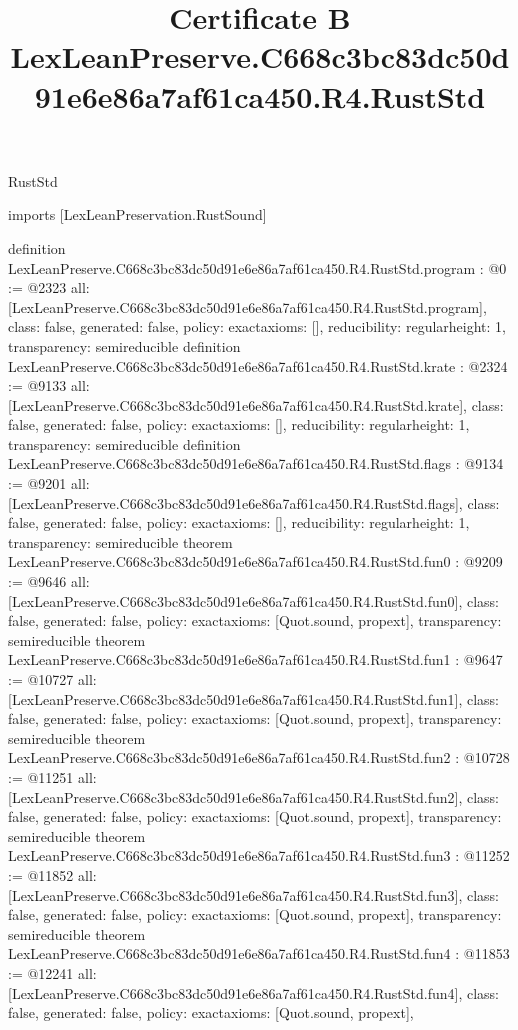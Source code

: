 \begin{lexlean}{RustStd}
\title{Certificate B LexLeanPreserve.C668c3bc83dc50d91e6e86a7af61ca450.R4.RustStd}
\begin{coremodule}
imports [LexLeanPreservation.RustSound]

definition LexLeanPreserve.C668c3bc83dc50d91e6e86a7af61ca450.R4.RustStd.program : @0 := @2323 {
  all: [LexLeanPreserve.C668c3bc83dc50d91e6e86a7af61ca450.R4.RustStd.program],
  class: false,
  generated: false,
  policy: exact{axioms: []},
  reducibility: regular{height: 1},
  transparency: semireducible
}
definition LexLeanPreserve.C668c3bc83dc50d91e6e86a7af61ca450.R4.RustStd.krate : @2324 := @9133 {
  all: [LexLeanPreserve.C668c3bc83dc50d91e6e86a7af61ca450.R4.RustStd.krate],
  class: false,
  generated: false,
  policy: exact{axioms: []},
  reducibility: regular{height: 1},
  transparency: semireducible
}
definition LexLeanPreserve.C668c3bc83dc50d91e6e86a7af61ca450.R4.RustStd.flags : @9134 := @9201 {
  all: [LexLeanPreserve.C668c3bc83dc50d91e6e86a7af61ca450.R4.RustStd.flags],
  class: false,
  generated: false,
  policy: exact{axioms: []},
  reducibility: regular{height: 1},
  transparency: semireducible
}
theorem LexLeanPreserve.C668c3bc83dc50d91e6e86a7af61ca450.R4.RustStd.fun0 : @9209 := @9646 {
  all: [LexLeanPreserve.C668c3bc83dc50d91e6e86a7af61ca450.R4.RustStd.fun0],
  class: false,
  generated: false,
  policy: exact{axioms: [Quot.sound, propext]},
  transparency: semireducible
}
theorem LexLeanPreserve.C668c3bc83dc50d91e6e86a7af61ca450.R4.RustStd.fun1 : @9647 := @10727 {
  all: [LexLeanPreserve.C668c3bc83dc50d91e6e86a7af61ca450.R4.RustStd.fun1],
  class: false,
  generated: false,
  policy: exact{axioms: [Quot.sound, propext]},
  transparency: semireducible
}
theorem LexLeanPreserve.C668c3bc83dc50d91e6e86a7af61ca450.R4.RustStd.fun2 : @10728 := @11251 {
  all: [LexLeanPreserve.C668c3bc83dc50d91e6e86a7af61ca450.R4.RustStd.fun2],
  class: false,
  generated: false,
  policy: exact{axioms: [Quot.sound, propext]},
  transparency: semireducible
}
theorem LexLeanPreserve.C668c3bc83dc50d91e6e86a7af61ca450.R4.RustStd.fun3 : @11252 := @11852 {
  all: [LexLeanPreserve.C668c3bc83dc50d91e6e86a7af61ca450.R4.RustStd.fun3],
  class: false,
  generated: false,
  policy: exact{axioms: [Quot.sound, propext]},
  transparency: semireducible
}
theorem LexLeanPreserve.C668c3bc83dc50d91e6e86a7af61ca450.R4.RustStd.fun4 : @11853 := @12241 {
  all: [LexLeanPreserve.C668c3bc83dc50d91e6e86a7af61ca450.R4.RustStd.fun4],
  class: false,
  generated: false,
  policy: exact{axioms: [Quot.sound, propext]},
}
\end{coremodule}
\end{lexlean}
